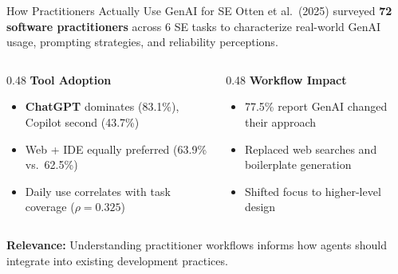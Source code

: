 \documentclass[
11pt,notheorems,hyperref={pdfauthor=whatever}
]{beamer}
\begin{document}
\begin{frame}{How Practitioners Actually Use GenAI for SE}
	Otten et al.\ (2025) surveyed \textbf{72 software practitioners} across 6 SE tasks to characterize real-world GenAI usage, prompting strategies, and reliability perceptions.

	\vspace{0.25cm}

	\begin{columns}[T]
		\begin{column}{0.48\textwidth}
			\textbf{Tool Adoption}
			\begin{itemize}
				\item \textbf{ChatGPT} dominates (83.1\%), Copilot second (43.7\%)
				\item Web + IDE equally preferred (63.9\% vs.\ 62.5\%)
				\item Daily use correlates with task coverage ($\rho = 0.325$)
			\end{itemize}
		\end{column}
		\hfill
		\begin{column}{0.48\textwidth}
			\textbf{Workflow Impact}
			\begin{itemize}
				\item 77.5\% report GenAI changed their approach
				\item Replaced web searches and boilerplate generation
				\item Shifted focus to higher-level design
			\end{itemize}
		\end{column}
	\end{columns}

	\vspace{0.25cm}

	\textbf{Relevance:} Understanding practitioner workflows informs how agents should integrate into existing development practices.
\end{frame}
\end{document}
